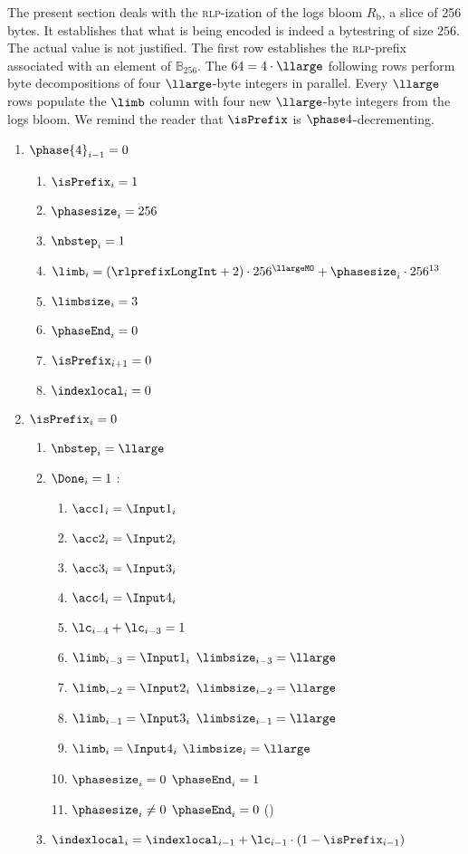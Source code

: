 \begin{center}
\end{center}

The present section deals with the \textsc{rlp}-ization of the logs bloom $R_\text{b}$, a slice of 256 bytes. It establishes that what is being encoded is indeed a bytestring of size $256$. The actual value is not justified. The first row establishes the \textsc{rlp}-prefix associated with an element of $\mathbb{B}_{256}$. The $64 = 4 \cdot \llarge$ following rows perform byte decompositions of four $\llarge$-byte integers in parallel. Every $\llarge$ rows populate the $\limb$ column with four new $\llarge$-byte integers from the logs bloom.
We remind the reader that $\isPrefix$ is $\phase 4$-decrementing.
\begin{enumerate}
	\item \If $\phase{4}_{i-1}=0$ \Then 
		\begin{enumerate}
			\item $\isPrefix_{i}=1$
			\item $\phasesize_{i}=256$
			\item $\nbstep_{i}=1$
			\item $\limb_{i}=(\rlprefixLongInt + 2) \cdot 256^{\llargeMO} + \phasesize_{i} \cdot 256 ^{13}$
			\item $\limbsize_{i}=3$
			\item $\phaseEnd_{i}=0$
			\item $\isPrefix_{i+1}=0$
			\item $\indexlocal_{i}=0$
		\end{enumerate}
	\item \If $\isPrefix_{i}=0$ \Then
		\begin{enumerate}
			\item $\nbstep_{i}=\llarge$
			\item \If $\Done_{i}=1$ \Then:
				\begin{enumerate}
					\item $\acc 1_{i}=\Input 1_{i}$
					\item $\acc 2_{i}=\Input 2_{i}$
					\item $\acc 3_{i}=\Input 3_{i}$
					\item $\acc 4_{i}=\Input 4_{i}$
					\item $\lc_{i-4}+\lc_{i-3}=1$
					\item $\limb_{i-3}=\Input 1 _{i}$ \et $\limbsize_{i-3}=\llarge$
					\item $\limb_{i-2}=\Input 2 _{i}$ \et $\limbsize_{i-2}=\llarge$
					\item $\limb_{i-1}=\Input 3 _{i}$ \et $\limbsize_{i-1}=\llarge$
					\item $\limb_{i}=\Input 4 _{i}$   \et $\limbsize_{i}=\llarge$
					\item \If $\phasesize_{i}=0$ \Then $\phaseEnd_{i}=1$
					\item \If $\phasesize_{i} \neq 0$ \Then $\phaseEnd_{i}=0$ (\trash)
				\end{enumerate}
			\item $\indexlocal_{i}=\indexlocal_{i-1}+\lc_{i-1} \cdot (1 - \isPrefix_{i-1})$
		\end{enumerate}
\end{enumerate}
